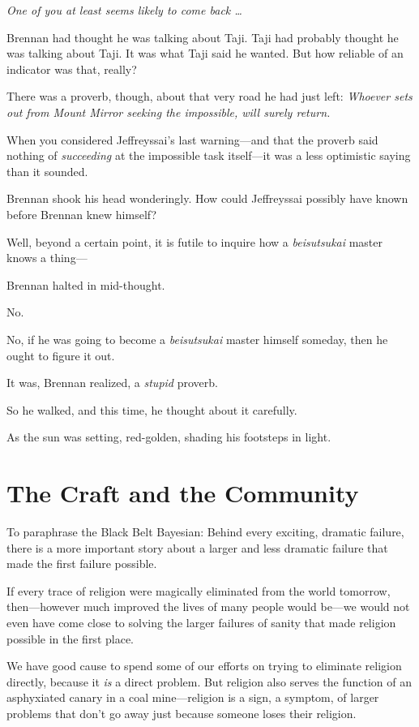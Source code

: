 {
 \textit{One of you at least seems likely to come back \ldots}}

{
 Brennan had thought he was talking about Taji. Taji had probably
thought he was talking about Taji. It was what Taji said he wanted. But
how reliable of an indicator was that, really?}

{
 There was a proverb, though, about that very road he had just
left: \textit{Whoever sets out from Mount Mirror seeking the
impossible, will surely return.}}

{
 When you considered Jeffreyssai's last
warning---and that the proverb said nothing of \textit{succeeding} at
the impossible task itself---it was a less optimistic saying than it
sounded.}

{
 Brennan shook his head wonderingly. How could Jeffreyssai possibly
have known before Brennan knew himself?}

{
 Well, beyond a certain point, it is futile to inquire how a
\textit{beisutsukai} master knows a thing---}

{
 Brennan halted in mid-thought.}

{
 No.}

{
 No, if he was going to become a \textit{beisutsukai} master
himself someday, then he ought to figure it out.}

{
 It was, Brennan realized, a \textit{stupid} proverb.}

{
 So he walked, and this time, he thought about it carefully.}

{
 As the sun was setting, red-golden, shading his footsteps in
light.}

\myendsectiontext

\chapter{The Craft and the Community}


{
 To paraphrase the Black Belt Bayesian: Behind every exciting,
dramatic failure, there is a more important story about a larger and
less dramatic failure that made the first failure possible. }

{
 If every trace of religion were magically eliminated from the
world tomorrow, then---however much improved the lives of many people
would be---we would not even have come close to solving the larger
failures of sanity that made religion possible in the first place.}

{
 We have good cause to spend some of our efforts on trying to
eliminate religion directly, because it \textit{is} a direct problem.
But religion also serves the function of an asphyxiated canary in a
coal mine---religion is a sign, a symptom, of larger problems that
don't go away just because someone loses their
religion.}

